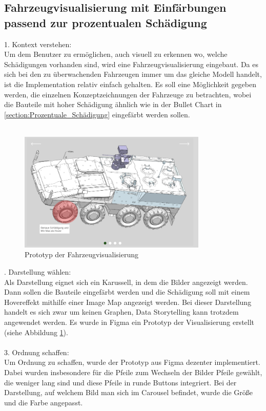 \subsection{Fahrzeugvisualisierung mit Einfärbungen passend zur prozentualen Schädigung}
\label{sec:vehicle-images}
1. Kontext verstehen:\\
Um dem Benutzer zu ermöglichen, auch visuell zu erkennen wo, welche Schädigungen vorhanden sind, wird eine Fahrzeugvisualisierung eingebaut. Da es sich bei den zu überwachenden Fahrzeugen immer um das gleiche Modell handelt, ist die Implementation relativ einfach gehalten. Es soll eine Möglichkeit gegeben werden, die einzelnen Konzeptzeichnungen der Fahrzeuge zu betrachten, wobei die Bauteile mit hoher Schädigung ähnlich wie in der Bullet Chart in \ref{section:Prozentuale_Schädigung} eingefärbt werden sollen.\\\\
\begin{figure}[h!]
\centering
\includegraphics[width=0.8\textwidth]{gfx/vehicle_visualisation.png}
\caption{Prototyp der Fahrzeugvisualisierung}
\label{fig:vehicle_visualisation}
\end{figure}
. Darstellung wählen:\\
Als Darstellung eignet sich ein Karussell, in dem die Bilder angezeigt werden. Dann sollen die Bauteile eingefärbt werden und die Schädigung soll mit einem Hovereffekt mithilfe einer Image Map angezeigt werden. Bei dieser Darstellung handelt es sich zwar um keinen Graphen, Data Storytelling kann trotzdem angewendet werden. Es wurde in Figma \cite{FigmaGmbH.2024} ein Prototyp der Visualisierung erstellt (siehe Abbildung \ref{fig:vehicle_visualisation}).\\\\
3. Ordnung schaffen:\\
Um Ordnung zu schaffen, wurde der Prototyp aus Figma \cite{FigmaGmbH.2024} dezenter implementiert. Dabei wurden insbesondere für die Pfeile zum Wechseln der Bilder Pfeile gewählt, die weniger lang sind und diese Pfeile in runde Buttons integriert. Bei der Darstellung, auf welchem Bild man sich im Carousel befindet, wurde die Größe und die Farbe angepasst.\\\\
